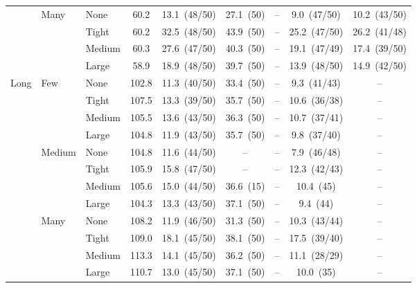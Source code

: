 \begin{table}[htbp]
\begin{tabular}{lll c ccccc}
 & \multirow{4}{*}{\small Many} & {\small None} & 60.2 & 13.1~{\scriptsize(48/50)} & 27.1~{\scriptsize(50)} & -- & 9.0~{\scriptsize(47/50)} & 10.2~{\scriptsize(43/50)} \\
 &  & {\small Tight} & 60.2 & 32.5~{\scriptsize(48/50)} & 43.9~{\scriptsize(50)} & -- & 25.2~{\scriptsize(47/50)} & 26.2~{\scriptsize(41/48)} \\
 &  & {\small Medium} & 60.3 & 27.6~{\scriptsize(47/50)} & 40.3~{\scriptsize(50)} & -- & 19.1~{\scriptsize(47/49)} & 17.4~{\scriptsize(39/50)} \\
 &  & {\small Large} & 58.9 & 18.9~{\scriptsize(48/50)} & 39.7~{\scriptsize(50)} & -- & 13.9~{\scriptsize(48/50)} & 14.9~{\scriptsize(42/50)} \\
\midrule
\multirow{12}{*}{\small Long} & \multirow{4}{*}{\small Few} & {\small None} & 102.8 & 11.3~{\scriptsize(40/50)} & 33.4~{\scriptsize(50)} & -- & 9.3~{\scriptsize(41/43)} & -- \\
 &  & {\small Tight} & 107.5 & 13.3~{\scriptsize(39/50)} & 35.7~{\scriptsize(50)} & -- & 10.6~{\scriptsize(36/38)} & -- \\
 &  & {\small Medium} & 105.5 & 13.6~{\scriptsize(43/50)} & 36.3~{\scriptsize(50)} & -- & 10.7~{\scriptsize(37/41)} & -- \\
 &  & {\small Large} & 104.8 & 11.9~{\scriptsize(43/50)} & 35.7~{\scriptsize(50)} & -- & 9.8~{\scriptsize(37/40)} & -- \\
 & \multirow{4}{*}{\small Medium} & {\small None} & 104.8 & 11.6~{\scriptsize(44/50)} & -- & -- & 7.9~{\scriptsize(46/48)} & -- \\
 &  & {\small Tight} & 105.9 & 15.8~{\scriptsize(47/50)} & -- & -- & 12.3~{\scriptsize(42/43)} & -- \\
 &  & {\small Medium} & 105.6 & 15.0~{\scriptsize(44/50)} & 36.6~{\scriptsize(15)} & -- & 10.4~{\scriptsize(45)} & -- \\
 &  & {\small Large} & 104.3 & 13.3~{\scriptsize(43/50)} & 37.1~{\scriptsize(50)} & -- & 9.4~{\scriptsize(44)} & -- \\
 & \multirow{4}{*}{\small Many} & {\small None} & 108.2 & 11.9~{\scriptsize(46/50)} & 31.3~{\scriptsize(50)} & -- & 10.3~{\scriptsize(43/44)} & -- \\
 &  & {\small Tight} & 109.0 & 18.1~{\scriptsize(45/50)} & 38.1~{\scriptsize(50)} & -- & 17.5~{\scriptsize(39/40)} & -- \\
 &  & {\small Medium} & 113.3 & 14.1~{\scriptsize(45/50)} & 36.2~{\scriptsize(50)} & -- & 11.1~{\scriptsize(28/29)} & -- \\
 &  & {\small Large} & 110.7 & 13.0~{\scriptsize(45/50)} & 37.1~{\scriptsize(50)} & -- & 10.0~{\scriptsize(35)} & -- \\
\bottomrule
\end{tabular}
\end{table}
